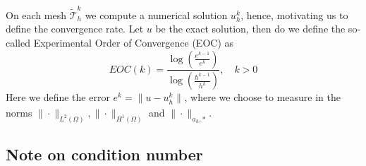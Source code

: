 On each mesh $\widetilde{\mathcal{T}}^{k}_{h}  $ we compute a numerical solution $u_{h}^{k}$, hence, motivating us to define the convergence rate. Let $u $ be the exact solution, then do we define the so-called Experimental Order of Convergence (EOC) as \[
EOC( k) =  \frac{\log \left(  \frac{e^{k-1}}{e^{k}} \right)}{\log \left(  \frac{h^{k-1}}{h^{k}} \right)}, \quad    k>0
\]
Here we define the error $e^{k} = \| u - u_{h}^{k} \|_{  }^{  } $, where we choose to measure in the norms $ \|\cdot   \|_{L^2( \Omega )   }^{  },   \|\cdot   \|_{H^1( \Omega )   }^{  } $ and $ \|\cdot   \|_{ a_{h},* }^{  }$.

\subsection{Note on condition number}%
\label{sub:note_on_condition_number}


